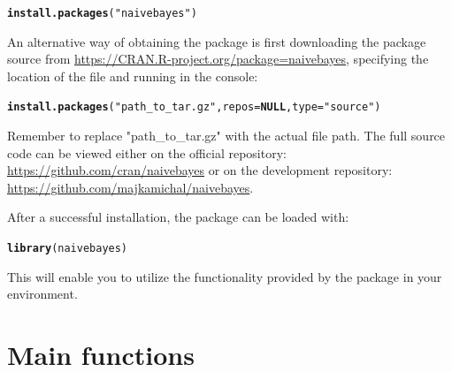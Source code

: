 \documentclass{article}\usepackage[]{graphicx}\usepackage[]{xcolor}
\makeatletter
\newcommand{\hlstr}[1]{\textcolor[rgb]{0.192,0.494,0.8}{#1}}%
\newcommand{\hlstd}[1]{\textcolor[rgb]{0.345,0.345,0.345}{#1}}%
\newcommand{\hlkwa}[1]{\textcolor[rgb]{0.161,0.373,0.58}{\textbf{#1}}}%
\newcommand{\hlkwc}[1]{\textcolor[rgb]{0.333,0.667,0.333}{#1}}%
\newcommand{\hlkwd}[1]{\textcolor[rgb]{0.737,0.353,0.396}{\textbf{#1}}}%
\newenvironment{kframe}{%
 \def\at@end@of@kframe{}%
 \ifinner\ifhmode%
  \def\at@end@of@kframe{\end{minipage}}%
  \begin{minipage}{\columnwidth}%
 \fi\fi%
 \def\FrameCommand##1{\hskip\@totalleftmargin \hskip-\fboxsep
 \colorbox{shadecolor}{##1}\hskip-\fboxsep
     \hskip-\linewidth \hskip-\@totalleftmargin \hskip\columnwidth}%
 \MakeFramed {\advance\hsize-\width
   \@totalleftmargin\z@ \linewidth\hsize
   \@setminipage}}%
 {\par\unskip\endMakeFramed%
 \at@end@of@kframe}
\newenvironment{knitrout}{}{} %
\makeatother
\begin{document}
\begin{knitrout}
\color{fgcolor}\begin{kframe}
\begin{alltt}
\hlkwd{install.packages}\hlstd{(}\hlstr{"naivebayes"}\hlstd{)}
\end{alltt}
\end{kframe}
\end{knitrout}

An alternative way of obtaining the package is first downloading the package source from \url{https://CRAN.R-project.org/package=naivebayes}, specifying the location of the file and running in the console:

\begin{knitrout}
\color{fgcolor}\begin{kframe}
\begin{alltt}
\hlkwd{install.packages}\hlstd{(}\hlstr{"path_to_tar.gz"}\hlstd{,} \hlkwc{repos} \hlstd{=} \hlkwa{NULL}\hlstd{,} \hlkwc{type} \hlstd{=} \hlstr{"source"}\hlstd{)}
\end{alltt}
\end{kframe}
\end{knitrout}

Remember to replace "path\_to\_tar.gz" with the actual file path. The full source code can be viewed either on the official \textcolor{darkgreen}{{\btt{}}} \textcolor{darkgreen}{{}} repository: \url{https://github.com/cran/naivebayes} or on the development repository: \url{https://github.com/majkamichal/naivebayes}.

After a successful installation, the package can be loaded with:

\begin{knitrout}
\color{fgcolor}\begin{kframe}
\begin{alltt}
\hlkwd{library}\hlstd{(naivebayes)}
\end{alltt}
\end{kframe}
\end{knitrout}

This will enable you to utilize the functionality provided by the \textcolor{darkgreen}{{}} package in your \textcolor{darkgreen}{{}} environment.

\section{Main functions}
\end{document}
